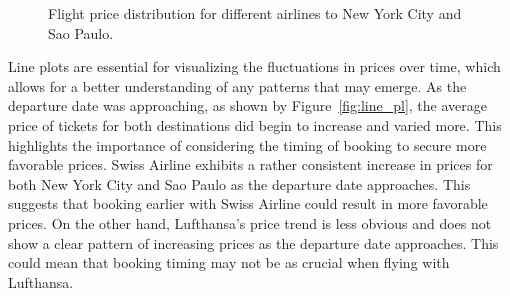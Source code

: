 \begin{figure}
    \centering
    \caption{Flight price distribution for different airlines to New York City and Sao Paulo.}
    \label{fig:box}
\end{figure}

Line plots are essential for visualizing the fluctuations in prices over time, which allows for a better understanding of any patterns that may emerge.
As the departure date was approaching, as shown by Figure~\ref{fig:line_pl}, the average price of tickets for both destinations did begin to increase and varied more.
This highlights the importance of considering the timing of booking to secure more favorable prices.
Swiss Airline exhibits a rather consistent increase in prices for both New York City and Sao Paulo as the departure date approaches.
This suggests that booking earlier with Swiss Airline could result in more favorable prices.
On the other hand, Lufthansa's price trend is less obvious and does not show a clear pattern of increasing prices as the departure date approaches.
This could mean that booking timing may not be as crucial when flying with Lufthansa.

